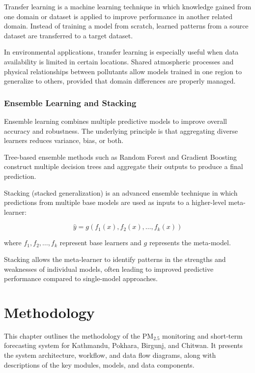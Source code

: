 \documentclass[12pt]{report}
\begin{document}
Transfer learning is a machine learning technique in which knowledge gained from one domain or dataset is applied to improve performance in another related domain. Instead of training a model from scratch, learned patterns from a source dataset are transferred to a target dataset.

In environmental applications, transfer learning is especially useful when data availability is limited in certain locations. Shared atmospheric processes and physical relationships between pollutants allow models trained in one region to generalize to others, provided that domain differences are properly managed.

\subsection{Ensemble Learning and Stacking}

Ensemble learning combines multiple predictive models to improve overall accuracy and robustness. The underlying principle is that aggregating diverse learners reduces variance, bias, or both.

Tree-based ensemble methods such as Random Forest and Gradient Boosting construct multiple decision trees and aggregate their outputs to produce a final prediction.

Stacking (stacked generalization) is an advanced ensemble technique in which predictions from multiple base models are used as inputs to a higher-level meta-learner:

\[
\hat{y} = g(f_1(x), f_2(x), \dots, f_k(x))
\]

where $f_1, f_2, \dots, f_k$ represent base learners and $g$ represents the meta-model.

Stacking allows the meta-learner to identify patterns in the strengths and weaknesses of individual models, often leading to improved predictive performance compared to single-model approaches.



\newpage


\chapter{Methodology}
\label{chap:methodology}

This chapter outlines the methodology of the PM$_{2.5}$ monitoring and short-term forecasting system for Kathmandu, Pokhara, Birgunj, and Chitwan. It presents the system architecture, workflow, and data flow diagrams, along with descriptions of the key modules, models, and data components.
\end{document}

